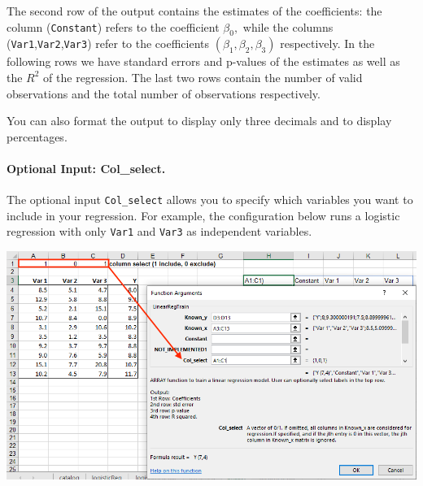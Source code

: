 \documentclass[12pt]{article}
\begin{document}
The second row of the output contains the estimates of the coefficients: the column (\texttt{Constant}) refers to the coefficient $\beta_0,$ while the columns (\texttt{Var1},\texttt{Var2},\texttt{Var3}) refer to the coefficients $(\beta_1,\beta_2,\beta_3)$ respectively. In the following rows we have standard errors and p-values of the estimates as well as the $R^2$ of the regression. The last two rows contain the number of valid observations and the total number of observations respectively.

You can also format the output to display only three decimals and to display percentages.


\paragraph{Optional Input: Col\_select.} The optional input \texttt{Col\_select} allows you to specify which variables you want to include in your regression. For example, the configuration below runs a logistic regression with only \texttt{Var1} and \texttt{Var3} as independent variables.
\medskip

\centerline{\includegraphics[width=6in]{figures/LinRegTrainOptional1}}

\medskip

\end{document}
